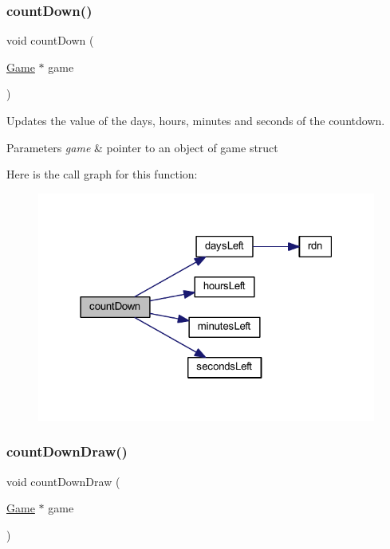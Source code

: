\subsubsection{\texorpdfstring{count\+Down()}{countDown()}}
{\footnotesize\ttfamily void count\+Down (\begin{DoxyParamCaption}\item[{\hyperlink{struct_game}{Game} $\ast$}]{game }\end{DoxyParamCaption})}



Updates the value of the days, hours, minutes and seconds of the countdown. 


\begin{DoxyParams}{Parameters}
{\em game} & pointer to an object of game struct \\
\hline
\end{DoxyParams}
Here is the call graph for this function\+:
\nopagebreak
\begin{figure}[H]
\begin{center}
\leavevmode
\includegraphics[width=316pt]{group___graphics_ga84e0c347e163833410a8df9d914402fa_cgraph}
\end{center}
\end{figure}
\mbox{\label{group___graphics_gaadff1c974f62a2b8f18fde71535809fb}} 
\subsubsection{\texorpdfstring{count\+Down\+Draw()}{countDownDraw()}}
{\footnotesize\ttfamily void count\+Down\+Draw (\begin{DoxyParamCaption}\item[{\hyperlink{struct_game}{Game} $\ast$}]{game }\end{DoxyParamCaption})}



